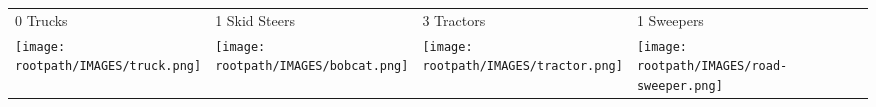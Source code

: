 \begin{tabular}{m{}m{}m{}m{}}
    {\color{ccorange} 0 Trucks} & {\color{ccorange} 1 Skid Steers} & {\color{ccorange} 3 Tractors} & {\color{ccorange} 1 Sweepers} \\
    \texttt{[image: \\rootpath/IMAGES/truck.png]}  & \texttt{[image: \\rootpath/IMAGES/bobcat.png]} & \texttt{[image: \\rootpath/IMAGES/tractor.png]} & \texttt{[image: \\rootpath/IMAGES/road-sweeper.png]}                         
    \end{tabular}
